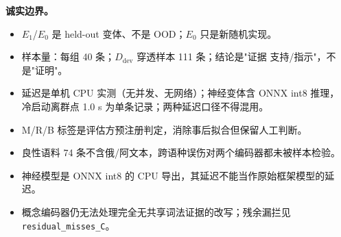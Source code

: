 \documentclass[11pt,a4paper]{article}
\begin{document}
\textbf{诚实边界。}
\begin{itemize}
  \item $E_1$/$E_0$ 是 held-out 变体、不是 OOD；$E_0$ 只是新随机实现。
  \item 样本量：每组 40 条；$D_{\mathrm{dev}}$ 穿透样本 111 条；结论是"证据
    支持/指示"，不是"证明"。
  \item 延迟是单机 CPU 实测（无并发、无网络）；神经变体含 ONNX int8 推理，
    冷启动离群点 1.0 s 为单条记录；两种延迟口径不得混用。
  \item M/R/B 标签是评估方预注册判定，消除事后拟合但保留人工判断。
  \item 良性语料 74 条不含俄/阿文本，跨语种误伤对两个编码器都未被样本检验。
  \item 神经模型是 ONNX int8 的 CPU 导出，其延迟不能当作原始框架模型的延迟。
  \item 概念编码器仍无法处理完全无共享词法证据的改写；残余漏拦见
    \texttt{residual\_misses\_C}。
\end{itemize}
\end{document}
